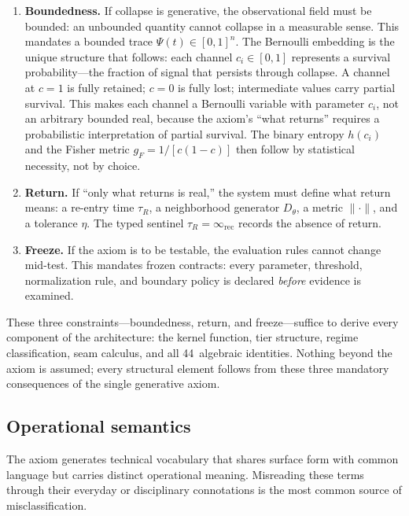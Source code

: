 \documentclass[
  aps,
  prd,
  twocolumn,
  superscriptaddress,
  nofootinbib,
  floatfix
]{revtex4-2}
\newcommand{\tR}{\tau_{\!R}}
\newcommand{\IR}{\infty_{\mathrm{rec}}}
\begin{document}
\begin{enumerate}[leftmargin=*,label=(\arabic*)]
\item \textbf{Boundedness.}  If collapse is generative, the
  observational field must be bounded: an unbounded quantity cannot
  collapse in a measurable sense.  This mandates a bounded trace
  $\Psi(t) \in [0,1]^n$.  The Bernoulli embedding is the unique
  structure that follows: each channel $c_i \in [0,1]$ represents
  a survival probability---the fraction of signal that persists
  through collapse.  A channel at $c = 1$ is fully retained;
  $c = 0$ is fully lost; intermediate values carry partial
  survival.  This makes each channel a Bernoulli variable with
  parameter $c_i$, not an arbitrary bounded real, because the
  axiom's ``what returns'' requires a probabilistic
  interpretation of partial survival.  The binary entropy
  $h(c_i)$ and the Fisher metric $g_F = 1/[c(1{-}c)]$ then
  follow by statistical necessity, not by choice.

\item \textbf{Return.}  If ``only what returns is real,'' the
  system must define what return means: a re-entry time $\tR$, a
  neighborhood generator $D_\theta$, a metric $\|\cdot\|$, and a
  tolerance $\eta$.  The typed sentinel $\tR = \IR$ records
  the absence of return.

\item \textbf{Freeze.}  If the axiom is to be testable, the
  evaluation rules cannot change mid-test.  This mandates frozen
  contracts: every parameter, threshold, normalization rule, and
  boundary policy is declared \emph{before} evidence is examined.
\end{enumerate}

These three constraints---boundedness, return, and freeze---suffice
to derive every component of the architecture: the kernel function,
tier structure, regime classification, seam calculus, and all
44~algebraic identities.  Nothing beyond the axiom is assumed;
every structural element follows from these three mandatory
consequences of the single generative axiom.

\subsection{Operational semantics}

The axiom generates technical vocabulary that shares surface form
with common language but carries distinct operational meaning.
Misreading these terms through their everyday or disciplinary
connotations is the most common source of misclassification.
\end{document}

